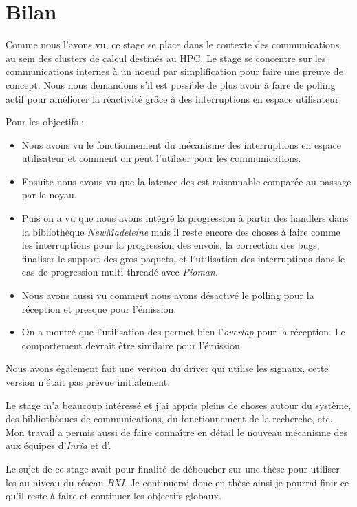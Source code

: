 \section{Bilan}

Comme nous l'avons vu, ce stage se place dans le contexte des communications au sein des clusters de calcul destinés au HPC.
Le stage se concentre sur les communications internes à un noeud par simplification pour faire une preuve de concept.
Nous nous demandons s'il est possible de plus avoir à faire de polling actif pour améliorer la réactivité grâce à des interruptions en espace utilisateur.

Pour les objectifs :
\begin{itemize}
  \item Nous avons vu le fonctionnement du mécanisme des interruptions en espace utilisateur et comment on peut l'utiliser pour les communications.
  \item Ensuite nous avons vu que la latence des \uintr{} est raisonnable comparée au passage par le noyau.
  \item Puis on a vu que nous avons intégré la progression à partir des handlers dans la bibliothèque \emph{NewMadeleine}
  mais il reste encore des choses à faire comme les interruptions pour la progression des envois,
  la correction des bugs, finaliser le support des gros paquets, et l'utilisation des interruptions dans le cas de progression multi-threadé avec \emph{Pioman}.
  \item Nous avons aussi vu comment nous avons désactivé le polling pour la réception et presque pour l'émission.
  \item On a montré que l'utilisation des \uintr{} permet bien l'\emph{overlap} pour la réception.
  Le comportement devrait être similaire pour l'émission.
\end{itemize}

Nous avons également fait une version du driver qui utilise les signaux, cette version n'était pas prévue initialement.

Le stage m'a beaucoup intéressé et j'ai appris pleins de choses autour du système, des bibliothèques de communications, du fonctionnement de la recherche, etc.
Mon travail a permis aussi de faire connaître en détail le nouveau mécanisme des \uintr{} aux équipes d'\emph{Inria} et d'\atos{}.

Le sujet de ce stage avait pour finalité de déboucher sur une thèse pour utiliser les \uintr{} au niveau du réseau \emph{BXI}.
Je continuerai donc en thèse ainsi je pourrai finir ce qu'il reste à faire et continuer les objectifs globaux.
